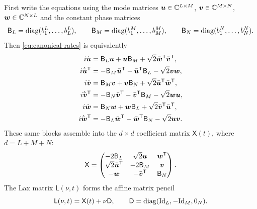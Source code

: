 First write the equations using the mode matrices
$\boldsymbol u\in\mathbb C^{L\times M}$,
$\boldsymbol v\in\mathbb C^{M\times N}$,
$\boldsymbol w\in\mathbb C^{N\times L}$ and the constant phase matrices
\begin{equation}\label{eq:canonical-diagonals}
 \mathsf B_L=\operatorname{diag}(b_1^L,\ldots,b_L^L),\qquad
 \mathsf B_M=\operatorname{diag}(b_1^M,\ldots,b_M^M),\qquad
 \mathsf B_N=\operatorname{diag}(b_1^N,\ldots,b_N^N).
\end{equation}
Then \cref{eq:canonical-rates} is equivalently
\begin{equation}\label{eq:canonical-matrix-rates}
\begin{aligned}
 i\dot{\boldsymbol u}
 &=\mathsf B_L\boldsymbol u+\boldsymbol u\mathsf B_M
       +\sqrt2\bar{\boldsymbol w}^{\mathsf T}\bar{\boldsymbol v}^{\mathsf T},\\
 i\dot{\bar{\boldsymbol u}}^{\mathsf T}
 &=-\mathsf B_M\bar{\boldsymbol u}^{\mathsf T}-\bar{\boldsymbol u}^{\mathsf T}\mathsf B_L
       -\sqrt2\boldsymbol v\boldsymbol w,\\
 i\dot{\boldsymbol v}
 &=\mathsf B_M\boldsymbol v+\boldsymbol v\mathsf B_N
       +\sqrt2\bar{\boldsymbol u}^{\mathsf T}\bar{\boldsymbol w}^{\mathsf T},\\
 i\dot{\bar{\boldsymbol v}}^{\mathsf T}
 &=-\mathsf B_N\bar{\boldsymbol v}^{\mathsf T}-\bar{\boldsymbol v}^{\mathsf T}\mathsf B_M
       -\sqrt2\boldsymbol w\boldsymbol u,\\
 i\dot{\boldsymbol w}
 &=\mathsf B_N\boldsymbol w+\boldsymbol w\mathsf B_L
       +\sqrt2\bar{\boldsymbol v}^{\mathsf T}\bar{\boldsymbol u}^{\mathsf T},\\
 i\dot{\bar{\boldsymbol w}}^{\mathsf T}
 &=-\mathsf B_L\bar{\boldsymbol w}^{\mathsf T}-\bar{\boldsymbol w}^{\mathsf T}\mathsf B_N
       -\sqrt2\boldsymbol u\boldsymbol v.
\end{aligned}
\end{equation}
These same blocks assemble into the $d\times d$ coefficient matrix
$\mathsf X(t)$, where $d=L+M+N$:
\begin{equation}\label{eq:canonical-X}
 \mathsf X=\begin{pmatrix}
 -2\mathsf B_L&\sqrt2\boldsymbol u&\bar{\boldsymbol w}^{\mathsf T}\\
 \sqrt2\bar{\boldsymbol u}^{\mathsf T}&-2\mathsf B_M&\boldsymbol v\\
 -\boldsymbol w&-\bar{\boldsymbol v}^{\mathsf T}&\mathsf B_N
 \end{pmatrix}.
\end{equation}
The Lax matrix $\mathsf L(\nu,t)$ forms the affine matrix pencil
\begin{equation}\label{eq:canonical-pencil}
 \mathsf L(\nu,t)=\mathsf X(t)+\nu\mathsf D,\qquad
 \mathsf D=\operatorname{diag}(\mathrm{Id}_L,-\mathrm{Id}_M,0_N).
\end{equation}
